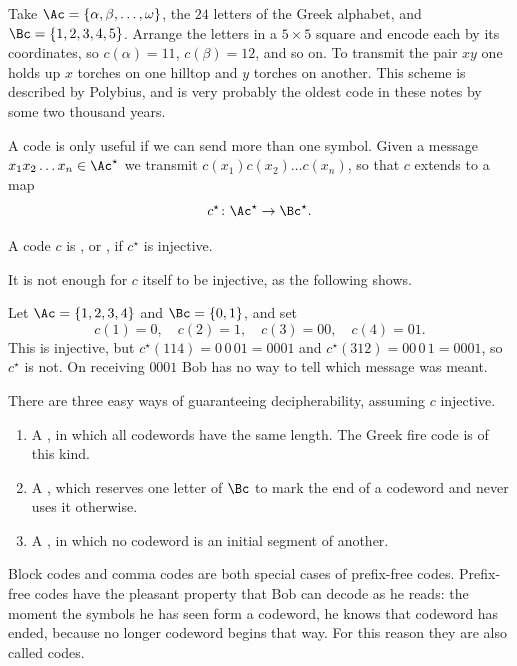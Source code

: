 \begin{example}
	Take $\Ac = \{\alpha, \beta, \dots, \omega\}$, the $24$ letters of the Greek alphabet, and $\Bc = \{1,2,3,4,5\}$. Arrange the letters in a $5 \times 5$ square and encode each by its coordinates, so $c(\alpha) = 11$, $c(\beta) = 12$, and so on. To transmit the pair $xy$ one holds up $x$ torches on one hilltop and $y$ torches on another. This scheme is described by Polybius, and is very probably the oldest code in these notes by some two thousand years.
\end{example}

A code is only useful if we can send more than one symbol. Given a message $x_1 x_2 \dots x_n \in \Ac^\star$ we transmit $c(x_1)c(x_2)\dots c(x_n)$, so that $c$ extends to a map
$$c^\star \colon \Ac^\star \to \Bc^\star.$$

\begin{definition}[Decipherable]
	A code $c$ is , or , if $c^\star$ is injective.
\end{definition}

It is not enough for $c$ itself to be injective, as the following shows.

\begin{example}
	Let $\Ac = \{1,2,3,4\}$ and $\Bc = \{0,1\}$, and set
	$$c(1) = 0, \quad c(2) = 1, \quad c(3) = 00, \quad c(4) = 01.$$
	This is injective, but $c^\star(114) = 0\,0\,01 = 0001$ and $c^\star(312) = 00\,0\,1 = 0001$, so $c^\star$ is not. On receiving $0001$ Bob has no way to tell which message was meant.
\end{example}

There are three easy ways of guaranteeing decipherability, assuming $c$ injective.

\begin{enumerate}[label=(\roman*)]
	\item A , in which all codewords have the same length. The Greek fire code is of this kind.
	\item A , which reserves one letter of $\Bc$ to mark the end of a codeword and never uses it otherwise.
	\item A , in which no codeword is an initial segment of another.
\end{enumerate}

Block codes and comma codes are both special cases of prefix-free codes. Prefix-free codes have the pleasant property that Bob can decode as he reads: the moment the symbols he has seen form a codeword, he knows that codeword has ended, because no longer codeword begins that way. For this reason they are also called  codes.

